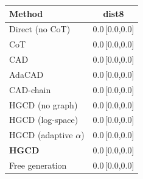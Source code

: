 \begin{tabular}{lc}
\toprule
Method & dist8 \\
\midrule
Direct (no CoT) & 0.0\,{\scriptsize[0.0,0.0]} \\
CoT & 0.0\,{\scriptsize[0.0,0.0]} \\
CAD & 0.0\,{\scriptsize[0.0,0.0]} \\
AdaCAD & 0.0\,{\scriptsize[0.0,0.0]} \\
CAD-chain & 0.0\,{\scriptsize[0.0,0.0]} \\
HGCD (no graph) & 0.0\,{\scriptsize[0.0,0.0]} \\
HGCD (log-space) & 0.0\,{\scriptsize[0.0,0.0]} \\
HGCD (adaptive $\alpha$) & 0.0\,{\scriptsize[0.0,0.0]} \\
\textbf{HGCD} & 0.0\,{\scriptsize[0.0,0.0]} \\
Free generation & 0.0\,{\scriptsize[0.0,0.0]} \\
\bottomrule
\end{tabular}
